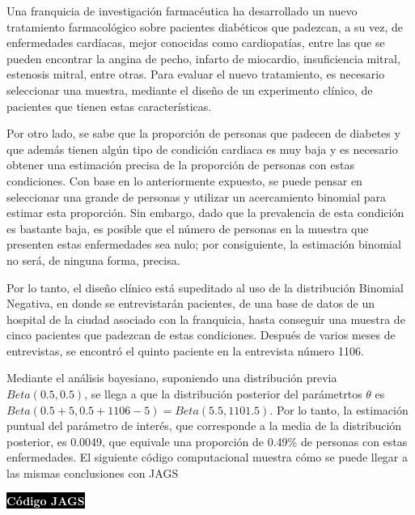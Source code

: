     \begin{Eje}
    Una franquicia de investigaci\'on farmac\'eutica ha desarrollado un nuevo tratamiento farmacol\'ogico sobre pacientes diab\'eticos que padezcan, a su vez, de enfermedades card\'iacas, mejor conocidas como cardiopat\'ias, entre las que se pueden encontrar la angina de pecho, infarto de miocardio,  insuficiencia mitral, estenosis mitral, entre otras. Para evaluar el nuevo tratamiento, es necesario seleccionar una muestra, mediante el dise\~no de un experimento cl\'inico, de pacientes que tienen estas caracter\'isticas.
    
    Por otro lado, se sabe que la proporci\'on de personas que padecen de diabetes y que adem\'as tienen alg\'un tipo de condici\'on cardiaca es muy baja y es necesario obtener una estimaci\'on precisa de la proporci\'on de personas con estas condiciones. Con base en lo anteriormente expuesto, se puede pensar en seleccionar una grande de personas y utilizar un acercamiento binomial para estimar esta proporci\'on. Sin embargo, dado que la prevalencia de esta condici\'on es bastante baja, es posible que el n\'umero de personas en la muestra que presenten estas enfermedades sea nulo; por consiguiente, la estimaci\'on binomial no ser\'a, de ninguna forma, precisa.
    
    Por lo tanto, el dise\~no cl\'inico est\'a supeditado al uso de la distribuci\'on Binomial Negativa, en donde se entrevistar\'an pacientes, de una base de datos de un hospital de la ciudad asociado con la franquicia, hasta conseguir una muestra de cinco pacientes que padezcan de estas condiciones. Despu\'es de varios meses de entrevistas, se encontr\'o el quinto paciente en la entrevista n\'umero 1106.
    
    Mediante el an\'alisis bayesiano, suponiendo una distribuci\'on previa $Beta(0.5, 0.5)$, se llega a que la distribuci\'on posterior del par\'ametrtos $\theta$ es $Beta(0.5+5, 0.5+1106-5)=Beta(5.5, 1101.5)$. Por lo tanto, la estimaci\'on puntual del par\'ametro de inter\'es, que corresponde a la media de la distribuci\'on posterior, es 0.0049, que equivale una proporci\'on de 0.49\% de personas con estas enfermedades. El siguiente c\'odigo computacional muestra c\'omo se puede llegar a las mismas conclusiones con JAGS
    
    \colorbox{black}{\textcolor{white}{\textbf{C\'odigo JAGS}}}
\begin{knitrout}
\color{fgcolor}\begin{kframe}
\begin{alltt}
 \hlkwb{<-} \hlstd{()\{}
 \hlopt{~} \hlstd{)}
\hlopt{~}\hlstd{(}\hlstd{,} \hlstd{)}
\hlstd{\}}


\end{alltt}
\end{kframe}
\end{knitrout}
\end{Eje}
